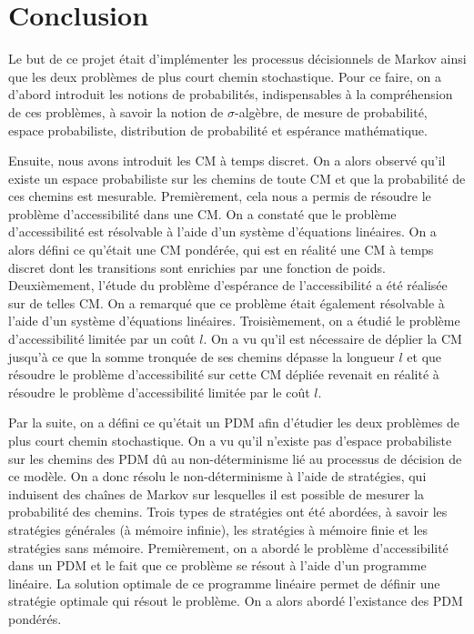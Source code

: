 \documentclass[12pt,a4paper]{report}
\theoremstyle{definition}%
\theoremstyle{remark}
\begin{document}
\chapter*{Conclusion}
Le but de ce projet était d'implémenter les processus décisionnels de Markov
ainsi que les deux problèmes de plus court chemin stochastique. Pour ce faire,
on a d'abord introduit les notions de probabilités, indispensables à la compréhension de ces problèmes, à savoir la notion de $\sigma$-algèbre,
de mesure de probabilité, espace probabiliste, distribution de probabilité et espérance mathématique.
\par Ensuite, nous avons introduit les CM à temps discret. On a alors observé qu'il existe un espace
probabiliste sur les chemins de toute CM et que la probabilité
de ces chemins est mesurable. Premièrement, cela nous a permis de résoudre le problème d'accessibilité dans une CM. On a constaté que le problème
d'accessibilité est résolvable à l'aide d'un système d'équations linéaires.
On a alors défini ce qu'était une CM pondérée, qui est en
réalité une CM à temps discret dont les transitions sont enrichies par une
fonction de poids. Deuxièmement, l'étude du problème d'espérance de l'accessibilité a été réalisée sur
de telles CM. On a remarqué que ce problème était également résolvable
à l'aide d'un système d'équations linéaires. Troisièmement, on a étudié le problème
d'accessibilité limitée par un coût $l$. On a vu qu'il est nécessaire de déplier
la CM jusqu'à ce que la somme tronquée de ses
chemins dépasse la longueur $l$ et que résoudre le problème
d'accessibilité sur cette CM dépliée revenait en réalité à résoudre
le problème d'accessibilité limitée par le coût $l$.
\par Par la suite, on a défini ce qu'était un PDM afin d'étudier les deux problèmes de plus court chemin stochastique. On a vu qu'il n'existe pas d'espace probabiliste sur les chemins des PDM dû au
non-déterminisme lié au processus de décision de ce modèle. On a donc résolu le non-déterminisme à
l'aide de stratégies, qui induisent des chaînes de Markov sur lesquelles il est
possible de mesurer la probabilité des chemins. Trois types de stratégies ont été abordées, à savoir les stratégies générales (à mémoire infinie), les stratégies à mémoire finie et les stratégies sans
mémoire. Premièrement, on a abordé le problème d'accessibilité
dans un PDM et le fait que ce problème se résout à
l'aide d'un programme linéaire. La solution optimale de ce programme
linéaire permet de définir une stratégie optimale qui résout le problème.
On a alors abordé l'existance des PDM pondérés.
\end{document}
